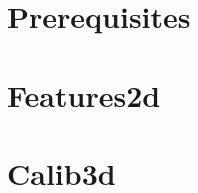 \chapter{Prerequisites}
\renewcommand{\curModule}{Prerequisites}



\chapter{Features2d}
\renewcommand{\curModule}{Features2d}


\chapter{Calib3d}
\renewcommand{\curModule}{Calib3d}


